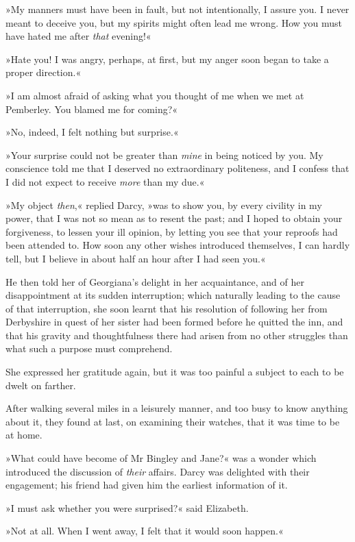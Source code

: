 »My manners must have been in fault, but not intentionally, I assure you. I never meant to deceive you, but my spirits might often lead me wrong. How you must have hated me after \textit{that} evening!«

»Hate you! I was angry, perhaps, at first, but my anger soon began to take a proper direction.«

»I am almost afraid of asking what you thought of me when we met at Pemberley. You blamed me for coming?«

»No, indeed, I felt nothing but surprise.«

»Your surprise could not be greater than \textit{mine} in being noticed by you. My conscience told me that I deserved no extraordinary politeness, and I confess that I did not expect to receive \textit{more} than my due.«

»My object \textit{then},« replied Darcy, »was to show you, by every civility in my power, that I was not so mean as to resent the past; and I hoped to obtain your forgiveness, to lessen your ill opinion, by letting you see that your reproofs had been attended to. How soon any other wishes introduced themselves, I can hardly tell, but I believe in about half an hour after I had seen you.«

He then told her of Georgiana's delight in her acquaintance, and of her disappointment at its sudden interruption; which naturally leading to the cause of that interruption, she soon learnt that his resolution of following her from Derbyshire in quest of her sister had been formed before he quitted the inn, and that his gravity and thoughtfulness there had arisen from no other struggles than what such a purpose must comprehend.

She expressed her gratitude again, but it was too painful a subject to each to be dwelt on farther.

After walking several miles in a leisurely manner, and too busy to know anything about it, they found at last, on examining their watches, that it was time to be at home.

»What could have become of Mr Bingley and Jane?« was a wonder which introduced the discussion of \textit{their} affairs. Darcy was delighted with their engagement; his friend had given him the earliest information of it.

»I must ask whether you were surprised?« said Elizabeth.

»Not at all. When I went away, I felt that it would soon happen.«


